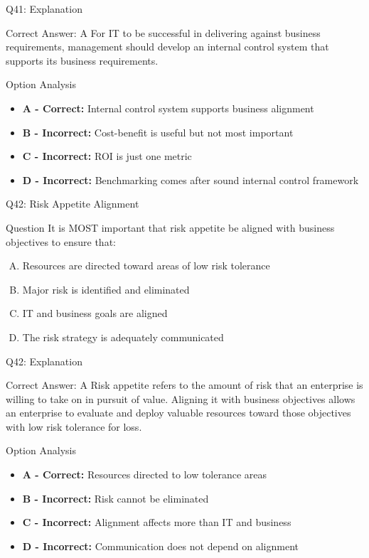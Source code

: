 \documentclass{beamer}
\begin{document}
	\begin{frame}{Q41: Explanation}
		\begin{block}{Correct Answer: A}
			For IT to be successful in delivering against business requirements, management should develop an internal control system that supports its business requirements.
		\end{block}
		\begin{block}{Option Analysis}
			\begin{itemize}
				\item \textbf{A - Correct:} Internal control system supports business alignment
				\item \textbf{B - Incorrect:} Cost-benefit is useful but not most important
				\item \textbf{C - Incorrect:} ROI is just one metric
				\item \textbf{D - Incorrect:} Benchmarking comes after sound internal control framework
			\end{itemize}
		\end{block}
	\end{frame}
	
	\begin{frame}{Q42: Risk Appetite Alignment}
		\begin{block}{Question}
			It is MOST important that risk appetite be aligned with business objectives to ensure that:
		\end{block}
		\begin{enumerate}[(A)]
			\item Resources are directed toward areas of low risk tolerance
			\item Major risk is identified and eliminated
			\item IT and business goals are aligned
			\item The risk strategy is adequately communicated
		\end{enumerate}
	\end{frame}
	
	\begin{frame}{Q42: Explanation}
		\begin{block}{Correct Answer: A}
			Risk appetite refers to the amount of risk that an enterprise is willing to take on in pursuit of value. Aligning it with business objectives allows an enterprise to evaluate and deploy valuable resources toward those objectives with low risk tolerance for loss.
		\end{block}
		\begin{block}{Option Analysis}
			\begin{itemize}
				\item \textbf{A - Correct:} Resources directed to low tolerance areas
				\item \textbf{B - Incorrect:} Risk cannot be eliminated
				\item \textbf{C - Incorrect:} Alignment affects more than IT and business
				\item \textbf{D - Incorrect:} Communication does not depend on alignment
			\end{itemize}
		\end{block}
	\end{frame}
	
\end{document}
